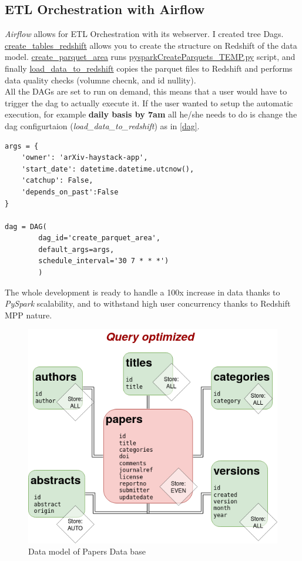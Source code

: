 \subsection{ETL Orchestration with Airflow}
\emph{Airflow} allows for ETL Orchestration with its webserver. I created tree Dags.  \href{https://github.com/gariciodaro/arXiv-haystack-app/blob/master/back_end/dags/createRedShiftDB.py}{create\_tables\_redshift} allows you to create the structure on Redshift of the data model. \href{https://github.com/gariciodaro/arXiv-haystack-app/blob/master/back_end/dags/sparkPreProcess.py}{create\_parquet\_area} runs \href{https://github.com/gariciodaro/arXiv-haystack-app/blob/master/back_end/scripts/pysparkCreateParquets_TEMP.py}{pysparkCreateParquets\_TEMP.py} script, and finally \href{https://github.com/gariciodaro/arXiv-haystack-app/blob/master/back_end/dags/RedShiftDataModel.py}{load\_data\_to\_redshift} copies the parquet files to Redshift and performs data quality checks (volumne checnk, and id nullity).\\

All the DAGs are set to run on demand, this means that a user would have to trigger the dag to actually execute it. If the user wanted to setup the automatic execution, for example \textbf{daily basis by 7am} all he/she needs to do is change the dag configurtaion (\emph{load\_data\_to\_redshift}) as in \ref{dag}.

\begin{mdframed}[backgroundcolor=light-gray, roundcorner=10pt,leftmargin=1, rightmargin=1, innerleftmargin=15, innertopmargin=15,innerbottommargin=15, outerlinewidth=1, linecolor=light-gray]
\begin{lstlisting}[caption={Dag configuration },label={dag}]  
args = {
    'owner': 'arXiv-haystack-app',
    'start_date': datetime.datetime.utcnow(),
    'catchup': False,
    'depends_on_past':False
}

dag = DAG(
        dag_id='create_parquet_area',
        default_args=args,
        schedule_interval='30 7 * * *')
        )
\end{lstlisting}
\end{mdframed} 

The whole development is ready to handle a 100x increase in data thanks to \emph{PySpark} scalability, and to withstand high user concurrency thanks to Redshift MPP nature.


\begin{figure}[h!]
\centering
\includegraphics[width=0.4\linewidth]{images/star_schema}
\caption{Data model of Papers Data base}
\label{fig:star_schema}
\end{figure}

